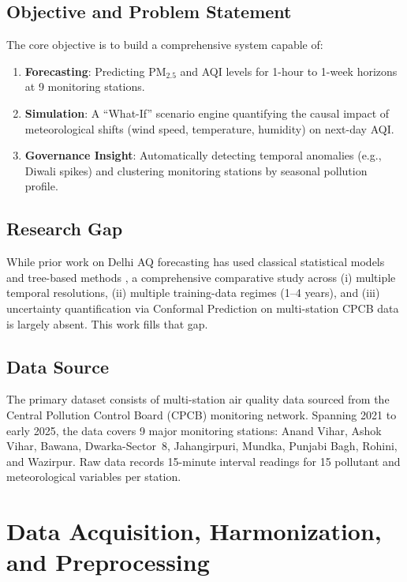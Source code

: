 \documentclass[11pt,a4paper]{article}
\begin{document}
\subsection{Objective and Problem Statement}
The core objective is to build a comprehensive system capable of:
\begin{enumerate}
    \item \textbf{Forecasting}: Predicting PM$_{2.5}$ and AQI levels for 1-hour to 1-week horizons at 9 monitoring stations.
    \item \textbf{Simulation}: A ``What-If'' scenario engine quantifying the causal impact of meteorological shifts (wind speed, temperature, humidity) on next-day AQI.
    \item \textbf{Governance Insight}: Automatically detecting temporal anomalies (e.g., Diwali spikes) and clustering monitoring stations by seasonal pollution profile.
\end{enumerate}

\subsection{Research Gap}
While prior work on Delhi AQ forecasting has used classical statistical models \cite{sarima} and tree-based methods \cite{xgboost}, a comprehensive comparative study across (i) multiple temporal resolutions, (ii) multiple training-data regimes (1--4 years), and (iii) uncertainty quantification via Conformal Prediction \cite{conformal} on multi-station CPCB data is largely absent. This work fills that gap.

\subsection{Data Source}
The primary dataset consists of multi-station air quality data sourced from the Central Pollution Control Board (CPCB) monitoring network. Spanning 2021 to early 2025, the data covers 9 major monitoring stations: Anand Vihar, Ashok Vihar, Bawana, Dwarka-Sector~8, Jahangirpuri, Mundka, Punjabi Bagh, Rohini, and Wazirpur. Raw data records 15-minute interval readings for 15 pollutant and meteorological variables per station.

\section{Data Acquisition, Harmonization, and Preprocessing}
\end{document}
